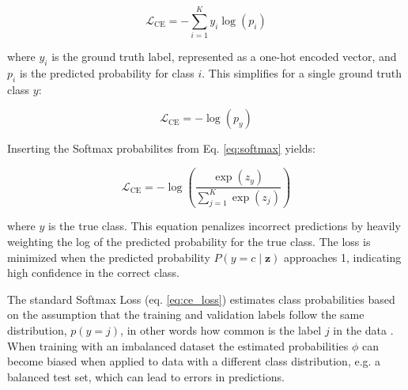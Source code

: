 \begin{equation}
    \label{eq:ce_multi}
    \mathcal{L}_{\text{CE}} = -\sum_{i=1}^{K} y_i \log(p_i)
\end{equation}

\noindent where $y_i$ is the ground truth label, represented as a one-hot encoded vector, and $p_i$ is the predicted probability for class $i$. This simplifies for a single ground truth class $y$:

\begin{equation}
    \label{eq:ce_single}
    \mathcal{L}_{\text{CE}} = - \log(p_y)
\end{equation}

\noindent Inserting the Softmax probabilites from Eq. \eqref{eq:softmax} yields:

\begin{equation}
    \label{eq:ce_loss}
    \mathcal{L}_{\text{CE}} = - \log\left(\frac{\exp(z_y)}{\sum_{j=1}^{K} \exp(z_j)}\right)
\end{equation}

\noindent where $y$ is the true class. This equation penalizes incorrect predictions by heavily weighting the log of the predicted probability for the true class. The loss is minimized when the predicted probability \( P(y = c \mid \mathbf{z}) \) approaches 1, indicating high confidence in the correct class.

The standard Softmax Loss (eq. \eqref{eq:ce_loss}) estimates class probabilities based on the assumption that the training and validation labels follow the same distribution, $p(y=j)$, in other words how common is the label $j$ in the data \cite{ren2020balancedmetasoftmaxlongtailedvisual}. When training with an imbalanced dataset the estimated probabilities $\phi$ can become biased when applied to data with a different class distribution, e.g. a balanced test set, which can lead to errors in predictions.


